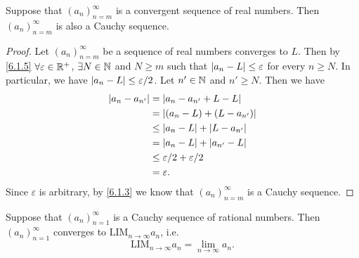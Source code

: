 \begin{prop}\label{6.1.12}
  Suppose that \((a_n)_{n = m}^\infty\) is a convergent sequence of real numbers.
  Then \((a_n)_{n = m}^\infty\) is also a Cauchy sequence.
\end{prop}

\begin{proof}
  Let \((a_n)_{n = m}^\infty\) be a sequence of real numbers converges to \(L\).
  Then by \cref{6.1.5} \(\forall \varepsilon \in \mathbb{R}^+\), \(\exists N \in \mathbb{N}\) and \(N \geq m\) such that \(\left\lvert a_n - L\right\rvert \leq \varepsilon\) for every \(n \geq N\).
  In particular, we have \(\left\lvert a_n - L\right\rvert \leq \varepsilon / 2\).
  Let \(n' \in \mathbb{N}\) and \(n' \geq N\).
  Then we have
  \begin{align*}
    \left\lvert a_n - a_{n'}\right\rvert & = \left\lvert a_n - a_{n'} + L - L\right\rvert           \\
                       & = \left\lvert(a_n - L) + (L - a_{n'})\right\rvert       \\
                       & \leq \left\lvert a_n - L\right\rvert + \left\lvert L - a_{n'}\right\rvert  \\
                       & = \left\lvert a_n - L\right\rvert + \left\lvert a_{n'} - L\right\rvert     \\
                       & \leq \varepsilon / 2 + \varepsilon / 2 \\
                       & = \varepsilon.
  \end{align*}
  Since \(\varepsilon\) is arbitrary, by \cref{6.1.3} we know that \((a_n)_{n = m}^\infty\) is a Cauchy sequence.
\end{proof}

\setcounter{thm}{14}
\begin{prop}\label{6.1.15}
  Suppose that \((a_n)_{n = 1}^\infty\) is a Cauchy sequence of rational numbers.
  Then \((a_n)_{n = 1}^\infty\) converges to \(\text{LIM}_{n \to \infty} a_n\), i.e.
  \[
    \text{LIM}_{n \to \infty} a_n = \lim_{n \to \infty} a_n.
  \]
\end{prop}

